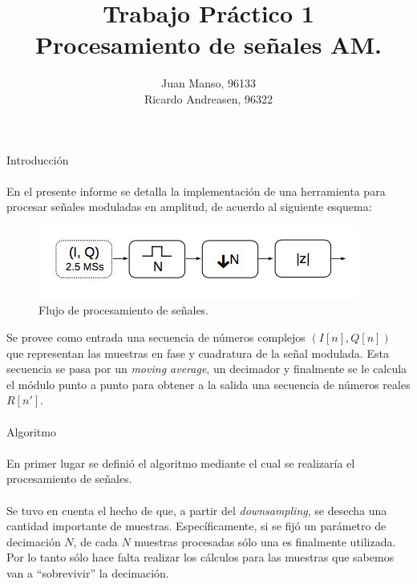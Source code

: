 \documentclass[11pt, spanish]{report}
\begin{document}
\title{{\Huge Trabajo Práctico 1} \\[2pt] {\huge Procesamiento de señales AM.}}
\author{{\Large Juan Manso, 96133}  \\ {\Large Ricardo Andreasen, 96322}}
\date{}
\maketitle

{\huge Introducción}

\paragraph{} En el presente informe se detalla la implementación de una herramienta para procesar señales moduladas en amplitud, de acuerdo al siguiente esquema:

\begin{figure}[h]
\centering
\includegraphics[width = 0.6 \textwidth]{flujo_senales}
\caption{Flujo de procesamiento de señales.}
\label{fig:flujo_senales}
\end{figure}

Se provee como entrada una secuencia de números complejos $(I[n],Q[n])$ que representan las muestras en fase y cuadratura de la señal modulada. Esta secuencia se pasa por un \textit{moving average}, un decimador y finalmente se le calcula el módulo punto a punto para obtener a la salida una secuencia de números reales $R[n']$.
 
\paragraph{}

{\huge Algoritmo}

\paragraph{} En primer lugar se definió el algoritmo mediante el cual se realizaría el procesamiento de señales. 

\paragraph{} Se tuvo en cuenta el hecho de que, a partir del \textit{downsampling}, se desecha una cantidad importante de muestras. Específicamente, si se fijó un parámetro de decimación $N$, de cada $N$ muestras procesadas sólo una es finalmente utilizada. Por lo tanto sólo hace falta realizar los cálculos para las muestras que sabemos van a ``sobrevivir'' la decimación.
\end{document}
